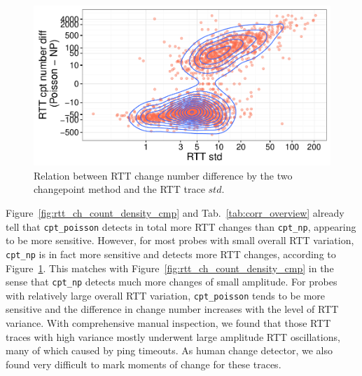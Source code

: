 \begin{figure}[!htb]
\centering
\includegraphics[width=.64\textwidth]{gfx/chap4/cpt_diff_vs_std.pdf}
\caption{Relation between RTT change number difference by the two changepoint method and the RTT trace $std$.}
\label{fig:cpt_diff_vs_std}
\end{figure}

Figure~\ref{fig:rtt_ch_count_density_cmp} and Tab.~\ref{tab:corr_overview} already tell that \texttt{cpt\_poisson} detects in total more RTT changes than \texttt{cpt\_np}, appearing to be more sensitive.
However, for most probes with small overall RTT variation, \texttt{cpt\_np} is in fact more sensitive and detects more RTT changes, according to Figure~\ref{fig:cpt_diff_vs_std}.
This matches with Figure~\ref{fig:rtt_ch_count_density_cmp} in the sense that \texttt{cpt\_np} detects much more changes of small amplitude.
For probes with relatively large overall RTT variation, \texttt{cpt\_poisson} tends to be more sensitive and the difference in change number increases with the level of RTT variance.
With comprehensive manual inspection, we found that those RTT traces with high variance mostly underwent large amplitude RTT oscillations, many of which caused by ping timeouts. As human change detector, we also found very difficult to mark moments of change for these traces.

